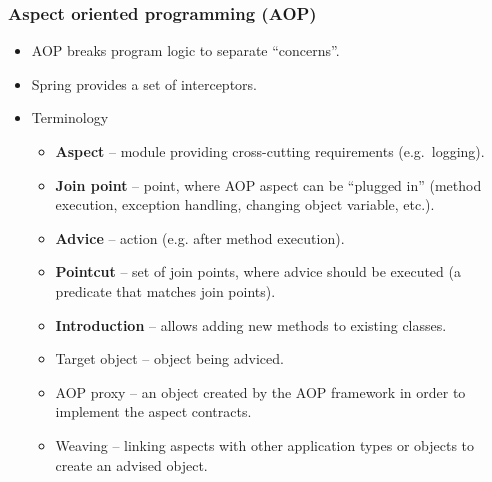 \documentclass[10pt,xcolor=pdflatex, table]{beamer}
\begin{document}
\begin{frame}\frametitle{Aspect oriented programming (AOP)}
	\begin{itemize}
		\item AOP breaks program logic to separate ``concerns''.
		\item Spring provides a set of interceptors.
		\item Terminology
          \begin{itemize}
        	\item \textbf{Aspect} -- module providing cross-cutting requirements (e.g.~logging).
        	\item \textbf{Join point} -- point, where AOP aspect can be ``plugged in'' (method execution, exception handling, changing object variable, etc.).
        	\item \textbf{Advice} -- action (e.g. after method execution).
        	\item \textbf{Pointcut} -- set of join points, where advice should be executed (a predicate that matches join points).
        	\item \textbf{Introduction} -- allows adding new methods to existing classes.
        	\item Target object -- object being adviced.
            \item AOP proxy -- an object created by the AOP framework in order to implement the aspect contracts.
        	\item Weaving -- linking aspects with other application types or objects to create an advised object.
          \end{itemize}
	\end{itemize}
\end{frame}
\end{document}
